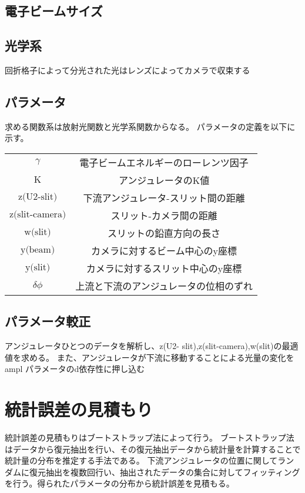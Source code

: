 \documentclass[a4paper,11pt,uplatex]{jsbook}
\begin{document}
\subsection{電子ビームサイズ}

\subsection{光学系}
回折格子によって分光された光はレンズによってカメラで収束する

\subsection{パラメータ}
求める関数系は放射光関数と光学系関数からなる。
パラメータの定義を以下に示す。


\begin{table}[h]
\centering
\begin{tabular}{c|c}
  $\gamma$ & 電子ビームエネルギーのローレンツ因子 \\
  $\text{K}$ & アンジュレータのK値 \\
  $\text{z(U2-slit)}$ & 下流アンジュレータ-スリット間の距離 \\
  $\text{z(slit-camera)}$ & スリット-カメラ間の距離 \\
  $\text{w(slit)}$ & スリットの鉛直方向の長さ \\
  $\text{y(beam)}$ & カメラに対するビーム中心のy座標 \\
  $\text{y(slit)}$ & カメラに対するスリット中心のy座標 \\
  $\delta \phi$ & 上流と下流のアンジュレータの位相のずれ\\
\end{tabular}
\end{table}


\subsection{パラメータ較正}
アンジュレータひとつのデータを解析し、z(U2- slit),z(slit-camera),w(slit)の最適値を求める。
また、アンジュレータが下流に移動することによる光量の変化をampl パラメータのd依存性に押し込む

\section{統計誤差の見積もり}
統計誤差の見積もりはブートストラップ法によって行う。
ブートストラップ法はデータから復元抽出を行い、その復元抽出データから統計量を計算することで統計量の分布を推定する手法である。
下流アンジュレータの位置に関してランダムに復元抽出を複数回行い、抽出されたデータの集合に対してフィッティングを行う。得られたパラメータの分布から統計誤差を見積もる。
\end{document}
